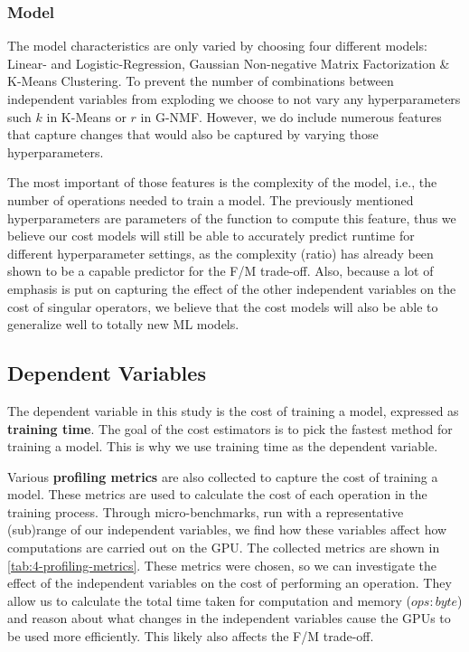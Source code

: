 \subsubsection{Model}
The model characteristics are only varied by choosing four different models: Linear- and Logistic-Regression, Gaussian Non-negative Matrix Factorization \& K-Means Clustering. To prevent the number of combinations between independent variables from exploding we choose to not vary any hyperparameters such $k$ in K-Means or $r$ in G-NMF. However, we do include numerous features that capture changes that would also be captured by varying those hyperparameters.

The most important of those features is the complexity of the model, i.e., the number of operations needed to train a model. The previously mentioned hyperparameters are parameters of the function to compute this feature, thus we believe our cost models will still be able to accurately predict runtime for different hyperparameter settings, as the complexity (ratio) has already been shown to be a capable predictor for the F/M trade-off. Also, because a lot of emphasis is put on capturing the effect of the other independent variables on the cost of singular operators, we believe that the cost models will also be able to generalize well to totally new ML models.

\subsection{Dependent Variables}

The dependent variable in this study is the cost of training a model, expressed as \textbf{training time}. The goal of the cost estimators is to pick the fastest method for training a model. This is why we use training time as the dependent variable.

Various \textbf{profiling metrics} are also collected to capture the cost of training a model. These metrics are used to calculate the cost of each operation in the training process. Through micro-benchmarks, run with a representative (sub)range of our independent variables, we find how these variables affect how computations are carried out on the GPU. The collected metrics are shown in \autoref{tab:4-profiling-metrics}. These metrics were chosen, so we can investigate the effect of the independent variables on the cost of performing an operation. They allow us to calculate the total time taken for computation and memory ($ops:byte$) and reason about what changes in the independent variables cause the GPUs to be used more efficiently. This likely also affects the F/M trade-off.

